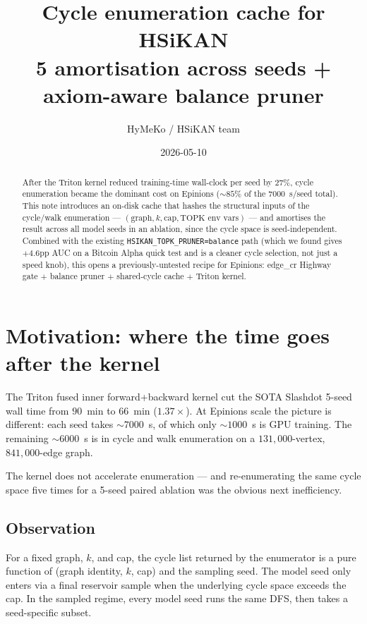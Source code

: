 \documentclass[11pt,a4paper]{article}
\title{\bfseries Cycle enumeration cache for HSiKAN \\
       \large 5\texttimes{} amortisation across seeds + axiom-aware
       balance pruner}
\author{HyMeKo / HSiKAN team}
\date{2026-05-10}
\begin{document}
\maketitle

\begin{abstract}
\noindent After the Triton kernel reduced training-time wall-clock
per seed by $27\%$, cycle enumeration became the dominant cost on
Epinions ($\sim 85\%$ of the $7000$~s/seed total).  This note
introduces an on-disk cache that hashes the structural inputs of
the cycle/walk enumeration --- $(\text{graph}, k, \text{cap},
\text{TOPK env vars})$ --- and amortises the result across all
model seeds in an ablation, since the cycle space is
seed-independent.  Combined with the existing
\texttt{HSIKAN\_TOPK\_PRUNER=balance} path (which we found gives
$+4.6$pp AUC on a Bitcoin Alpha quick test and is a cleaner cycle
selection, not just a speed knob), this opens a previously-untested
recipe for Epinions: edge\_cr Highway gate $+$ balance pruner $+$
shared-cycle cache $+$ Triton kernel.
\end{abstract}

\section{Motivation: where the time goes after the kernel}

The Triton fused inner forward+backward kernel cut the SOTA Slashdot
5-seed wall time from $90$~min to $66$~min ($1.37\times$).  At
Epinions scale the picture is different: each seed takes
$\sim 7000$~s, of which only $\sim 1000$~s is GPU training.  The
remaining $\sim 6000$~s is in cycle and walk enumeration on a
$131{,}000$-vertex, $841{,}000$-edge graph.

The kernel does not accelerate enumeration --- and re-enumerating
the same cycle space five times for a 5-seed paired ablation was
the obvious next inefficiency.

\subsection*{Observation}

For a fixed graph, $k$, and cap, the cycle list returned by the
enumerator is a pure function of (graph identity, $k$, cap) and the
sampling seed.  The model seed only enters via a final reservoir
sample when the underlying cycle space exceeds the cap.  In the
sampled regime, every model seed runs the same DFS, then takes a
seed-specific subset.
\end{document}
